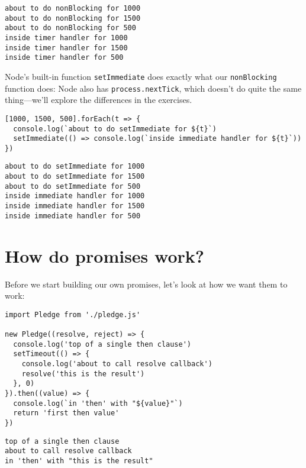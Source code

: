 \documentclass[krantzl]{krantz}
\begin{document}
\begin{lstlisting}[frame=tblr,backgroundcolor=\color{black!5}]
about to do nonBlocking for 1000
about to do nonBlocking for 1500
about to do nonBlocking for 500
inside timer handler for 1000
inside timer handler for 1500
inside timer handler for 500
\end{lstlisting}



Node’s built-in function \texttt{setImmediate}
does exactly what our \texttt{nonBlocking} function does:
Node also has \texttt{process.nextTick},
which doesn’t do quite the same thing—we’ll explore the differences in the exercises.


\begin{lstlisting}[frame=tblr]
[1000, 1500, 500].forEach(t => {
  console.log(`about to do setImmediate for ${t}`)
  setImmediate(() => console.log(`inside immediate handler for ${t}`))
})
\end{lstlisting}



\begin{lstlisting}[frame=tblr,backgroundcolor=\color{black!5}]
about to do setImmediate for 1000
about to do setImmediate for 1500
about to do setImmediate for 500
inside immediate handler for 1000
inside immediate handler for 1500
inside immediate handler for 500
\end{lstlisting}


\section{How do promises work?}\label{async-programming-promises}


Before we start building our own promises,
let’s look at how we want them to work:


\begin{lstlisting}[frame=tblr]
import Pledge from './pledge.js'

new Pledge((resolve, reject) => {
  console.log('top of a single then clause')
  setTimeout(() => {
    console.log('about to call resolve callback')
    resolve('this is the result')
  }, 0)
}).then((value) => {
  console.log(`in 'then' with "${value}"`)
  return 'first then value'
})
\end{lstlisting}



\begin{lstlisting}[frame=tblr,backgroundcolor=\color{black!5}]
top of a single then clause
about to call resolve callback
in 'then' with "this is the result"
\end{lstlisting}
\end{document}
